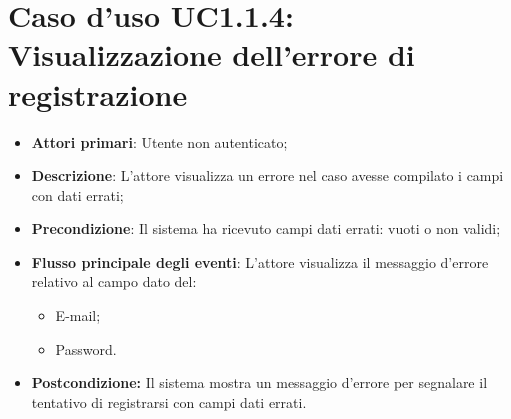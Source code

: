 \section{Caso d'uso UC1.1.4: Visualizzazione dell'errore di registrazione}
\begin{itemize}
	\item \textbf{Attori primari}: Utente non autenticato;
	\item \textbf{Descrizione}: L'attore visualizza un errore nel caso avesse compilato i campi con dati errati;
	\item \textbf{Precondizione}: Il sistema ha ricevuto campi dati errati: vuoti o non validi;
	\item \textbf{Flusso principale degli eventi}: L'attore visualizza il messaggio d'errore relativo al campo dato del:
	\begin{itemize}
		\item E-mail;
		\item Password.
	\end{itemize}
	\item \textbf{Postcondizione:} Il sistema mostra un messaggio d'errore per segnalare il tentativo di registrarsi con campi dati errati.
\end{itemize}

